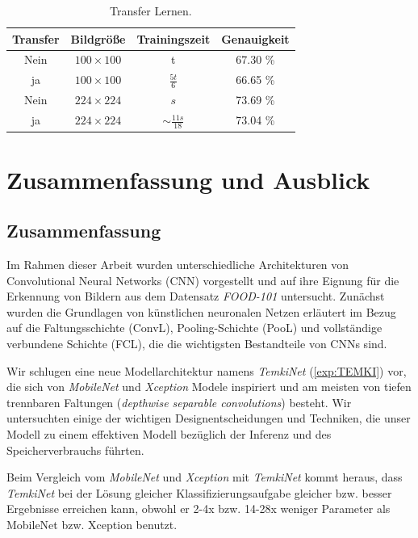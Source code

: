 \documentclass[12pt,a4paper]{scrartcl}
\numberwithin{equation}{section}
\begin{document}
\begin{table}[h!]
	\centering
	\begin{tabular}{*{4}{|c}|}
		\hline
		Transfer & Bildgröße 		& Trainingszeit    		  & Genauigkeit  \\ \hline
		Nein 	 & $ 100\times100 $ & t 			   		  & 67.30 \%  \\ \hline
		ja 		 & $ 100\times100 $ & $ \frac{5t}{6} $ 		  & 66.65 \%  \\ \hline
		Nein	 & $ 224\times224 $ & $ s $ 		   		  & 73.69 \%  \\ \hline
		ja 		 & $ 224\times224 $ & $ \sim \frac{11s}{18} $ & 73.04 \%  \\ \hline
	\end{tabular}
\caption{Transfer Lernen.}
\label{exp:TL}
\end{table}

\section{Zusammenfassung und Ausblick}
\subsection{Zusammenfassung}
Im Rahmen dieser Arbeit wurden unterschiedliche Architekturen von Convolutional
Neural Networks (CNN) vorgestellt und auf ihre Eignung für die Erkennung von Bildern aus dem Datensatz \textit{FOOD-101} untersucht. Zunächst wurden die Grundlagen von
künstlichen neuronalen Netzen erläutert im Bezug auf die Faltungsschichte (\ac{ConvL}), Pooling-Schichte (\ac{PooL}) und vollständige verbundene Schichte (\ac{FCL}), die die wichtigsten Bestandteile von \acsp{CNN} sind.

Wir schlugen eine neue Modellarchitektur namens \textit{TemkiNet} (\ref{exp:TEMKI}) vor, die sich von \textit{MobileNet} und \textit{Xception} Modele inspiriert und am meisten von tiefen trennbaren Faltungen (\textit{depthwise separable convolutions}) besteht. Wir untersuchten einige der wichtigen Designentscheidungen und Techniken, die unser Modell zu einem effektiven Modell bezüglich der Inferenz und des Speicherverbrauchs führten.

Beim Vergleich vom \textit{MobileNet} und \textit{Xception} mit \textit{TemkiNet} kommt heraus, dass \textit{TemkiNet} bei der Lösung gleicher Klassifizierungsaufgabe gleicher bzw. besser Ergebnisse erreichen kann, obwohl er 2-4x bzw. 14-28x weniger Parameter als MobileNet bzw. Xception benutzt.
\end{document}
